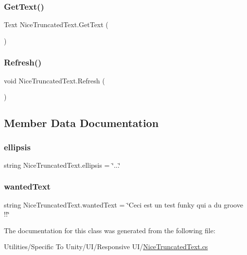 \subsubsection{\texorpdfstring{Get\+Text()}{GetText()}}
{\footnotesize\ttfamily Text Nice\+Truncated\+Text.\+Get\+Text (\begin{DoxyParamCaption}{ }\end{DoxyParamCaption})\hspace{0.3cm}{\ttfamily [inline]}}

\mbox{\label{class_nice_truncated_text_ab8e633b48e6f2272b10219e0b4709b71}} 
\subsubsection{\texorpdfstring{Refresh()}{Refresh()}}
{\footnotesize\ttfamily void Nice\+Truncated\+Text.\+Refresh (\begin{DoxyParamCaption}{ }\end{DoxyParamCaption})\hspace{0.3cm}{\ttfamily [inline]}}



\subsection{Member Data Documentation}
\mbox{\label{class_nice_truncated_text_a5ef5240eb588ff3b754350f8f54b876a}} 
\subsubsection{\texorpdfstring{ellipsis}{ellipsis}}
{\footnotesize\ttfamily string Nice\+Truncated\+Text.\+ellipsis = \char`\"{}...\char`\"{}}

\mbox{\label{class_nice_truncated_text_a2c5d5911671fcda5f98e8aff3ba09dc3}} 
\subsubsection{\texorpdfstring{wanted\+Text}{wantedText}}
{\footnotesize\ttfamily string Nice\+Truncated\+Text.\+wanted\+Text = \char`\"{}Ceci est un test funky qui a du groove !!\char`\"{}}



The documentation for this class was generated from the following file\+:\begin{DoxyCompactItemize}
\item 
Utilities/\+Specific To Unity/\+U\+I/\+Responsive U\+I/\hyperlink{_nice_truncated_text_8cs}{Nice\+Truncated\+Text.\+cs}\end{DoxyCompactItemize}
